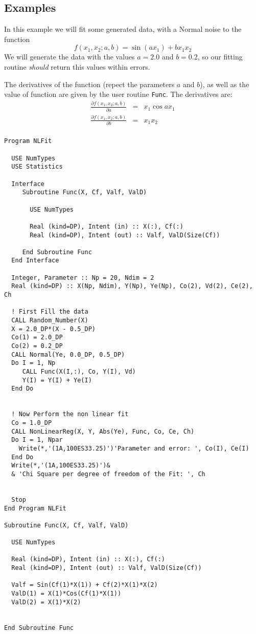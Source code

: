 \subsection{Examples}

In this example we will fit some generated data, with a Normal noise
to the function
\begin{displaymath}
  f(x_1,x_2;a,b) = \sin(ax_1) + bx_1x_2
\end{displaymath}
We will generate the data with the values $a=2.0$ and $b=0.2$, so our
fitting routine \emph{should} return this values within errors.

The derivatives of the function (repect the parameters $a$ and $b$),
as well as the value of function are given by the user routine
\texttt{Func}. The derivatives are:
\begin{eqnarray*}
  \frac{\partial f(x_1,x_2;a,b)}{\partial a} &=& x_1\cos{ax_1} \\
  \frac{\partial f(x_1,x_2;a,b)}{\partial b} &=& x_1x_2 \\
\end{eqnarray*}


\begin{lstlisting}[emph=NonLinearReg,
                   emphstyle=\color{blue},
                   frame=trBL,
                   caption=Doing non linear regressions.,
                   label=linearreg]
Program NLFit

  USE NumTypes
  USE Statistics

  Interface
     Subroutine Func(X, Cf, Valf, ValD)
       
       USE NumTypes
       
       Real (kind=DP), Intent (in) :: X(:), Cf(:)
       Real (kind=DP), Intent (out) :: Valf, ValD(Size(Cf))
       
     End Subroutine Func
  End Interface

  Integer, Parameter :: Np = 20, Ndim = 2
  Real (kind=DP) :: X(Np, Ndim), Y(Np), Ye(Np), Co(2), Vd(2), Ce(2), Ch

  ! First Fill the data
  CALL Random_Number(X)
  X = 2.0_DP*(X - 0.5_DP)
  Co(1) = 2.0_DP
  Co(2) = 0.2_DP
  CALL Normal(Ye, 0.0_DP, 0.5_DP)
  Do I = 1, Np
     CALL Func(X(I,:), Co, Y(I), Vd)
     Y(I) = Y(I) + Ye(I)
  End Do
  

  ! Now Perform the non linear fit
  Co = 1.0_DP
  CALL NonLinearReg(X, Y, Abs(Ye), Func, Co, Ce, Ch)
  Do I = 1, Npar
    Write(*,'(1A,100ES33.25)')'Parameter and error: ', Co(I), Ce(I)
  End Do
  Write(*,'(1A,100ES33.25)')&
  & 'Chi Square per degree of freedom of the Fit: ', Ch


  Stop
End Program NLFit

Subroutine Func(X, Cf, Valf, ValD)
  
  USE NumTypes
  
  Real (kind=DP), Intent (in) :: X(:), Cf(:)
  Real (kind=DP), Intent (out) :: Valf, ValD(Size(Cf))

  Valf = Sin(Cf(1)*X(1)) + Cf(2)*X(1)*X(2)
  ValD(1) = X(1)*Cos(Cf(1)*X(1))
  ValD(2) = X(1)*X(2)

  
End Subroutine Func
\end{lstlisting}

